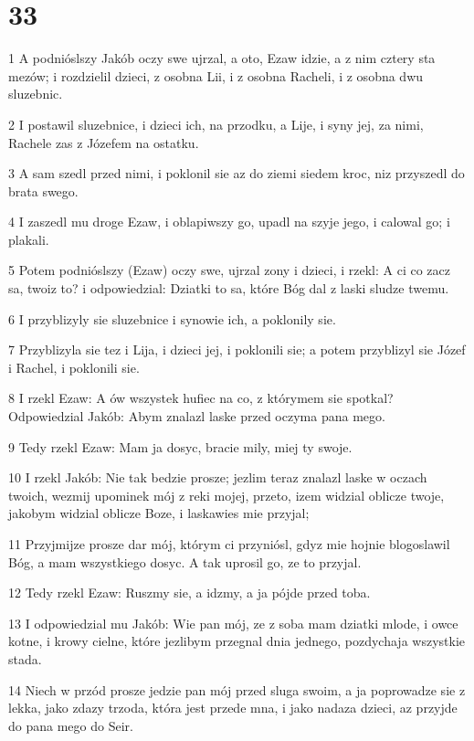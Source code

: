 \chapter{33}

\par 1 A podnióslszy Jakób oczy swe ujrzal, a oto, Ezaw idzie, a z nim cztery sta mezów; i rozdzielil dzieci, z osobna Lii, i z osobna Racheli, i z osobna dwu sluzebnic.
\par 2 I postawil sluzebnice, i dzieci ich, na przodku, a Lije, i syny jej, za nimi, Rachele zas z Józefem na ostatku.
\par 3 A sam szedl przed nimi, i poklonil sie az do ziemi siedem kroc, niz przyszedl do brata swego.
\par 4 I zaszedl mu droge Ezaw, i oblapiwszy go, upadl na szyje jego, i calowal go; i plakali.
\par 5 Potem podnióslszy (Ezaw) oczy swe, ujrzal zony i dzieci, i rzekl: A ci co zacz sa, twoiz to? i odpowiedzial: Dziatki to sa, które Bóg dal z laski sludze twemu.
\par 6 I przyblizyly sie sluzebnice i synowie ich, a poklonily sie.
\par 7 Przyblizyla sie tez i Lija, i dzieci jej, i poklonili sie; a potem przyblizyl sie Józef i Rachel, i poklonili sie.
\par 8 I rzekl Ezaw: A ów wszystek hufiec na co, z którymem sie spotkal? Odpowiedzial Jakób: Abym znalazl laske przed oczyma pana mego.
\par 9 Tedy rzekl Ezaw: Mam ja dosyc, bracie mily, miej ty swoje.
\par 10 I rzekl Jakób: Nie tak bedzie prosze; jezlim teraz znalazl laske w oczach twoich, wezmij upominek mój z reki mojej, przeto, izem widzial oblicze twoje, jakobym widzial oblicze Boze, i laskawies mie przyjal;
\par 11 Przyjmijze prosze dar mój, którym ci przyniósl, gdyz mie hojnie blogoslawil Bóg, a mam wszystkiego dosyc. A tak uprosil go, ze to przyjal.
\par 12 Tedy rzekl Ezaw: Ruszmy sie, a idzmy, a ja pójde przed toba.
\par 13 I odpowiedzial mu Jakób: Wie pan mój, ze z soba mam dziatki mlode, i owce kotne, i krowy cielne, które jezlibym przegnal dnia jednego, pozdychaja wszystkie stada.
\par 14 Niech w przód prosze jedzie pan mój przed sluga swoim, a ja poprowadze sie z lekka, jako zdazy trzoda, która jest przede mna, i jako nadaza dzieci, az przyjde do pana mego do Seir.
